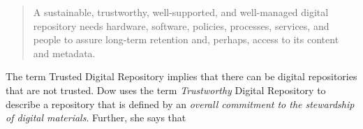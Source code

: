 \begin{quote}A sustainable, trustworthy, well-supported, and well-managed digital repository needs hardware, software, policies, processes, services, and people to assure long-term retention and, perhaps, access to its content and metadata.\cite{dow_elizabeth_2009} \end{quote}
The term Trusted Digital Repository implies that there can be digital repositories that are not trusted. Dow uses the term \emph{Trustworthy} Digital Repository to describe a repository that is defined by an \emph{overall commitment to the stewardship of digital materials}\cite{dow_elizabeth_2009}. Further, she says that 
